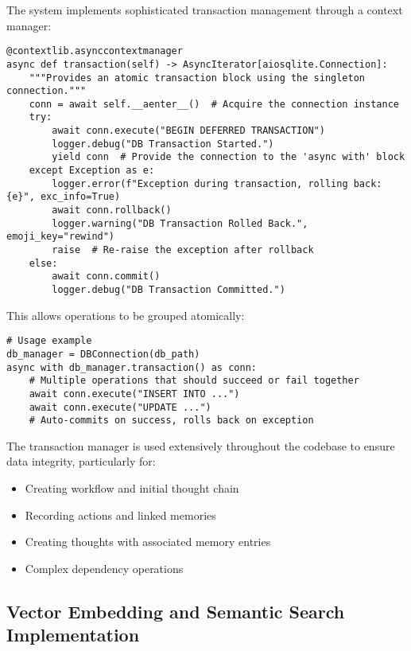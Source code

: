 \documentclass[12pt,a4paper]{article}
\begin{document}
The system implements sophisticated transaction management through a context manager:
\begin{pageablecode}
\begin{verbatim}
@contextlib.asynccontextmanager
async def transaction(self) -> AsyncIterator[aiosqlite.Connection]:
    """Provides an atomic transaction block using the singleton connection."""
    conn = await self.__aenter__()  # Acquire the connection instance
    try:
        await conn.execute("BEGIN DEFERRED TRANSACTION")
        logger.debug("DB Transaction Started.")
        yield conn  # Provide the connection to the 'async with' block
    except Exception as e:
        logger.error(f"Exception during transaction, rolling back: {e}", exc_info=True)
        await conn.rollback()
        logger.warning("DB Transaction Rolled Back.", emoji_key="rewind")
        raise  # Re-raise the exception after rollback
    else:
        await conn.commit()
        logger.debug("DB Transaction Committed.")
\end{verbatim}
\end{pageablecode}
This allows operations to be grouped atomically:
\begin{pageablecode}
\begin{verbatim}
# Usage example
db_manager = DBConnection(db_path)
async with db_manager.transaction() as conn:
    # Multiple operations that should succeed or fail together
    await conn.execute("INSERT INTO ...")
    await conn.execute("UPDATE ...")
    # Auto-commits on success, rolls back on exception
\end{verbatim}
\end{pageablecode}
The transaction manager is used extensively throughout the codebase to ensure data integrity, particularly for:
\begin{itemize}
    \item Creating workflow and initial thought chain
    \item Recording actions and linked memories
    \item Creating thoughts with associated memory entries
    \item Complex dependency operations
\end{itemize}

\subsection*{Vector Embedding and Semantic Search Implementation}
\end{document}
